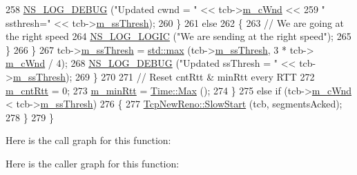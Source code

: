 \begin{DoxyCode}
258                   \hyperlink{group__logging_ga413f1886406d49f59a6a0a89b77b4d0a}{NS\_LOG\_DEBUG} (\textcolor{stringliteral}{"Updated cwnd = "} << tcb->\hyperlink{classns3_1_1TcpSocketState_a7cd3d2156a483c1db436097477a0fd7f}{m\_cWnd} <<
259                                 \textcolor{stringliteral}{" ssthresh="} << tcb->\hyperlink{classns3_1_1TcpSocketState_aec003b6dba9d269bfb1036c7652ffbd6}{m\_ssThresh});
260                 \}
261               \textcolor{keywordflow}{else}
262                 \{
263                   \textcolor{comment}{// We are going at the right speed}
264                   \hyperlink{group__logging_ga88acd260151caf2db9c0fc84997f45ce}{NS\_LOG\_LOGIC} (\textcolor{stringliteral}{"We are sending at the right speed"});
265                 \}
266             \}
267           tcb->\hyperlink{classns3_1_1TcpSocketState_aec003b6dba9d269bfb1036c7652ffbd6}{m\_ssThresh} = \hyperlink{80211b_8c_affe776513b24d84b39af8ab0930fef7f}{std::max} (tcb->\hyperlink{classns3_1_1TcpSocketState_aec003b6dba9d269bfb1036c7652ffbd6}{m\_ssThresh}, 3 * tcb->
      \hyperlink{classns3_1_1TcpSocketState_a7cd3d2156a483c1db436097477a0fd7f}{m\_cWnd} / 4);
268           \hyperlink{group__logging_ga413f1886406d49f59a6a0a89b77b4d0a}{NS\_LOG\_DEBUG} (\textcolor{stringliteral}{"Updated ssThresh = "} << tcb->\hyperlink{classns3_1_1TcpSocketState_aec003b6dba9d269bfb1036c7652ffbd6}{m\_ssThresh});
269         \}
270 
271       \textcolor{comment}{// Reset cntRtt & minRtt every RTT}
272       \hyperlink{classns3_1_1TcpVegas_a4149c239657ba2ea7399374ec0fd9682}{m\_cntRtt} = 0;
273       \hyperlink{classns3_1_1TcpVegas_aba6a10d787820b6907313b79cc16582c}{m\_minRtt} = \hyperlink{classns3_1_1Time_ad3414eb47d40a34971d5e78db88cfc72}{Time::Max} ();
274     \}
275   \textcolor{keywordflow}{else} \textcolor{keywordflow}{if} (tcb->\hyperlink{classns3_1_1TcpSocketState_a7cd3d2156a483c1db436097477a0fd7f}{m\_cWnd} < tcb->\hyperlink{classns3_1_1TcpSocketState_aec003b6dba9d269bfb1036c7652ffbd6}{m\_ssThresh})
276     \{
277       \hyperlink{classns3_1_1TcpNewReno_a1cf5fd9585eb3b745727f4f5beae0706}{TcpNewReno::SlowStart} (tcb, segmentsAcked);
278     \}
279 \}
\end{DoxyCode}


Here is the call graph for this function\+:




Here is the caller graph for this function\+:


